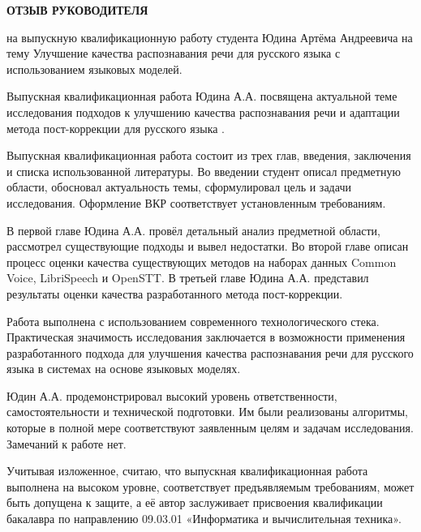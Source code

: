 \newpage
\clearpage
\begin{center}
    \textbf{ОТЗЫВ РУКОВОДИТЕЛЯ}
\end{center}

на выпускную квалификационную работу студента Юдина Артёма Андреевича на тему Улучшение качества распознавания речи для русского языка с использованием языковых моделей.

Выпускная квалификационная работа Юдина А.А. посвящена актуальной теме исследования подходов к улучшению качества распознавания речи и адаптации метода пост-коррекции для русского языка .

Выпускная квалификационная работа состоит из трех глав, введения, заключения и списка использованной литературы.
Во введении студент описал предметную области, обосновал актуальность темы, сформулировал цель и задачи исследования.
Оформление ВКР соответствует установленным требованиям.

В первой главе Юдина А.А. провёл детальный анализ предметной области, рассмотрел существующие подходы и вывел недостатки.
Во второй главе описан процесс оценки качества существующих методов на наборах данных Common Voice, LibriSpeech и OpenSTT.
В третьей главе Юдина А.А. представил результаты оценки качества разработанного метода пост-коррекции.

Работа выполнена с использованием современного технологического стека.
Практическая значимость исследования заключается в возможности применения разработанного подхода для улучшения качества распознавания речи для русского языка в системах на основе языковых моделях.

Юдин А.А. продемонстрировал высокий уровень ответственности, самостоятельности и технической подготовки.
Им были реализованы алгоритмы, которые в полной мере соответствуют заявленным целям и задачам исследования.
Замечаний к работе нет.

Учитывая изложенное, считаю, что выпускная квалификационная работа выполнена на высоком уровне, соответствует предъявляемым требованиям, может быть допущена к защите, а её автор заслуживает присвоения квалификации бакалавра по направлению 09.03.01 «Информатика и вычислительная техника».
\thispagestyle{empty}
